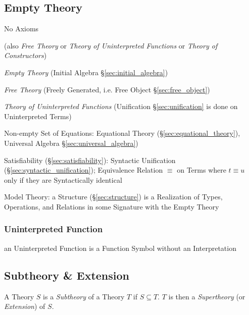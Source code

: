 \subsection{Empty Theory}\label{sec:empty_theory}

No Axioms

(also \emph{Free Theory} or \emph{Theory of Uninterpreted Functions}
or \emph{Theory of Constructors})

\emph{Empty Theory} (Initial Algebra \S\ref{sec:initial_algebra})

\emph{Free Theory} (Freely Generated, i.e. Free Object
\S\ref{sec:free_object})

\emph{Theory of Uninterpreted Functions} (Unification
\S\ref{sec:unification} is done on Uninterpreted Terms)


Non-empty Set of Equations: Equational Theory
(\S\ref{sec:equational_theory}), Universal Algebra
\S\ref{sec:universal_algebra})

Satisfiability (\S\ref{sec:satisfiability}): Syntactic Unification
(\S\ref{sec:syntactic_unification}); Equivalence Relation $\equiv$ on
Terms where $t \equiv u$ only if they are Syntactically identical

Model Theory: a Structure (\S\ref{sec:structure}) is a Realization of
Types, Operations, and Relations in some Signature with the Empty
Theory



\subsubsection{Uninterpreted Function}
\label{sec:uninterpreted_function}

an Uninterpreted Function is a Function Symbol without an
Interpretation



\subsection{Subtheory \& Extension}\label{sec:subtheory}

A Theory $S$ is a \emph{Subtheory} of a Theory $T$ if $S \subseteq T$.
$T$ is then a \emph{Supertheory} (or \emph{Extension}) of $S$.



